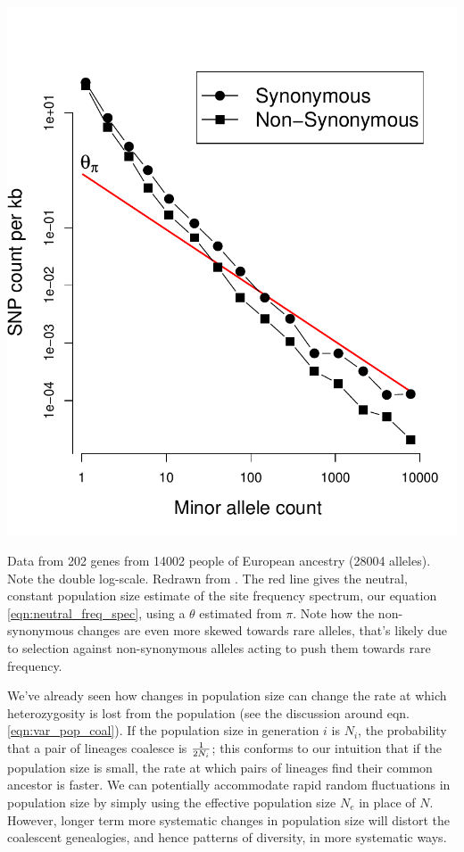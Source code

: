 \begin{marginfigure}
\begin{center}
  \includegraphics[width = \textwidth]{Journal_figs/genetic_drift/human_pop_growth/Nelson_pop_growth.pdf}
\end{center}
\caption{Data from 202 genes from 14002 people of European ancestry (28004 alleles). Note
  the double log-scale. Redrawn from \citeauthor{nelson:12}. The red
  line gives the neutral, constant population size estimate of the site frequency spectrum, our equation \eqref{eqn:neutral_freq_spec}, using a  $\theta$ estimated from $\pi$. Note how the non-synonymous changes are even more skewed towards rare alleles, that's likely due to selection against non-synonymous alleles acting to push them towards rare frequency.} \label{fig:Human_growth}
\end{marginfigure}
We've already seen how changes in population size can change the rate
at which heterozygosity is lost from the population (see the
discussion around eqn. \eqref{eqn:var_pop_coal}). If the population
size in generation $i$ is $N_i$, the probability that a pair of
lineages coalesce is $\nicefrac{1}{2N_i}$; this conforms to our
intuition that if the population size is small, the rate at which
pairs of lineages find their common ancestor is faster. We can potentially accommodate rapid random fluctuations in population size by simply using the effective population size $N_e$ in place of $N$. However,
longer term more systematic changes in population size will distort
the coalescent genealogies, and hence patterns of diversity, in more
systematic ways. 

